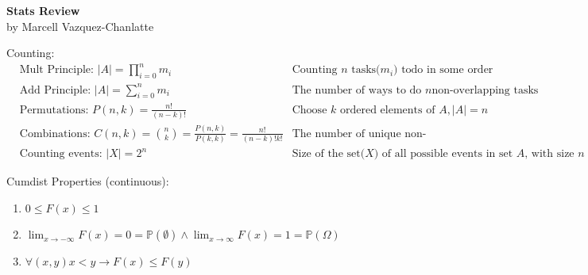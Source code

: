\documentclass[12pt]{article}
\newcommand{\abs}[1]{\left| #1 \right|} %
\renewcommand{\=}[1]{\stackrel{#1}{=}} %
\theoremstyle{definition}
\theoremstyle{remark}
\begin{document}
\begin{center}
  {\LARGE
    \textbf{Stats Review}\\
    \normalsize
    \textnormal {by Marcell Vazquez-Chanlatte}
    \\[1ex]}

  
\end{center}

Counting:
\begin{align*}
  & \textrm{Mult Principle:  } \abs{A}= \displaystyle\prod_{i = 0}^{n}
  m_i & \textrm{Counting $n$ tasks($m_i$) todo in some
    order}\\
  & \textrm{Add Principle: } \abs{A} = \sum_{i=0}^n m_i & \textrm{The number of ways to do $n$
    non-overlapping tasks}\\
  & \textrm{Permutations: } P(n,k) = \frac{n!}{(n-k)!} & \textrm{Choose $k$ ordered elements of $A, \abs{A}=
    n$} \\
  & \textrm{Combinations: }
  C(n,k) = \binom{n}{k} = \frac{P(n,k)}{P(k,k)} =
  \frac{n!}{(n-k)!k!} & \textrm{The number of unique non-ordered
    lists}\\
  & \textrm{Counting events: } \abs{X} =
  2^n & \textrm{Size of the set($X$) of all possible events in set
    $A$, with size $n$}
\end{align*}

Cumdist Properties (continuous):
\begin{enumerate}
\item $0 \leq F(x) \leq 1$
\item $ \lim_{x\rightarrow -\infty}F(x) = 0 = \mathbb{P}(\emptyset) \wedge
  \lim_{x\rightarrow \infty}F(x) = 1 = \mathbb{P}(\Omega)$
\item $\forall (x,y) x<y \rightarrow F(x) \leq F(y)$
\end{enumerate}
\end{document}
